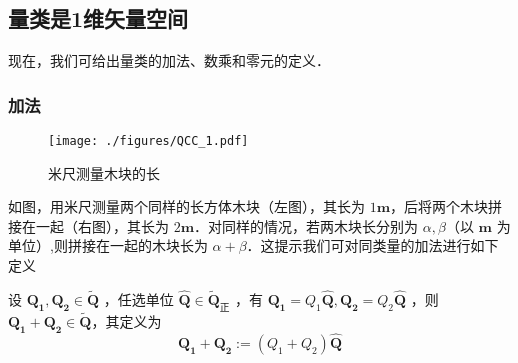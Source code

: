 \subsection{量类是1维矢量空间}
现在，我们可给出量类的加法、数乘和零元的定义．
\subsubsection{加法}
\begin{figure}[ht]
\centering
\texttt{[image: ./figures/QCC\_1.pdf]}
\caption{米尺测量木块的长} \label{QCC_fig1}
\end{figure}
如图，用米尺测量两个同样的长方体木块（左图），其长为 $1\boldsymbol{m}$，后将两个木块拼接在一起（右图），其长为 $2\boldsymbol{m}$．对同样的情况，若两木块长分别为 $\alpha ,\beta$（以 $\boldsymbol{m}$ 为单位）,则拼接在一起的木块长为 $\alpha+\beta$．这提示我们可对同类量的加法进行如下定义
\begin{definition}{}
设 $\boldsymbol{Q_1},\boldsymbol{Q_2}\in \tilde{\boldsymbol{Q}}$ ，任选单位 $\hat{\boldsymbol{Q}}\in\tilde{\boldsymbol{Q}}_{\text{正}}$ ，有 $\boldsymbol{Q_1}=Q_1\hat{\boldsymbol{Q}}, \boldsymbol{Q_2}=Q_2\hat{\boldsymbol{Q}}$ ，则 $\boldsymbol{Q_1}+\boldsymbol{Q_2}\in\tilde{\boldsymbol{Q}}$，其定义为
\begin{equation}
\boldsymbol{Q_1}+\boldsymbol{Q_2}:=(Q_1+Q_2)\hat{\boldsymbol{Q}}
\end{equation}
\end{definition}
